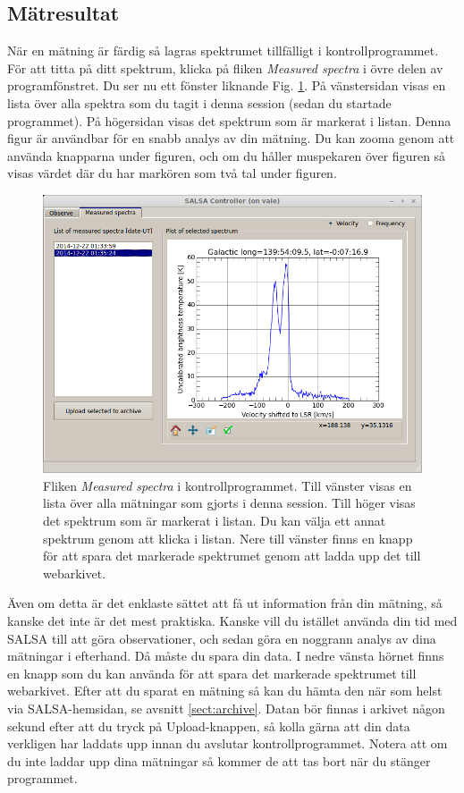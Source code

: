 \subsection{Mätresultat}
\label{sect:inspect}
När en mätning är färdig så lagras spektrumet tillfälligt i kontrollprogrammet. 
För att titta på ditt spektrum, klicka på fliken \emph{Measured spectra} i 
övre delen av programfönstret. Du ser nu ett fönster liknande Fig.  
\ref{fig:controlspectra}. På vänstersidan visas en lista över alla spektra som du
tagit i denna session (sedan du startade programmet). På högersidan visas det spektrum
som är markerat i listan. Denna figur är användbar för en snabb analys av din mätning. 
Du kan zooma genom att använda knapparna under figuren, och om du håller muspekaren
över figuren så visas värdet där du har markören som två tal under figuren. 
\begin{figure}[ht]
\begin{center}
\includegraphics[width=\textwidth]{../figures/Controller_spectra.png}
\end{center}
\caption{Fliken \emph{Measured spectra} i kontrollprogrammet. Till vänster
	visas en lista över alla mätningar som gjorts i denna session. Till höger 
	visas det spektrum som är markerat i listan. Du kan välja ett annat spektrum
	genom att klicka i listan. Nere till vänster finns en knapp för att spara
	det markerade spektrumet genom att ladda upp det till webarkivet. 
}
\label{fig:controlspectra}
\end{figure}
Även om detta är det enklaste sättet att få ut information från din mätning,
så kanske det inte är det mest praktiska. Kanske vill du istället använda din tid
med SALSA till att göra observationer, och sedan göra en noggrann analys av dina
mätningar i efterhand. Då måste du spara din data. I nedre vänsta hörnet finns en 
knapp som du kan använda för att spara det markerade spektrumet till webarkivet.
Efter att du sparat en mätning så kan du hämta den när som helst via SALSA-hemsidan,
se avsnitt \ref{sect:archive}. Datan bör finnas i arkivet någon sekund
efter att du tryck på Upload-knappen, så kolla gärna att din data verkligen 
har laddats upp innan du avslutar kontrollprogrammet. Notera att om du inte 
laddar upp dina mätningar så kommer de att tas bort när du stänger programmet.

